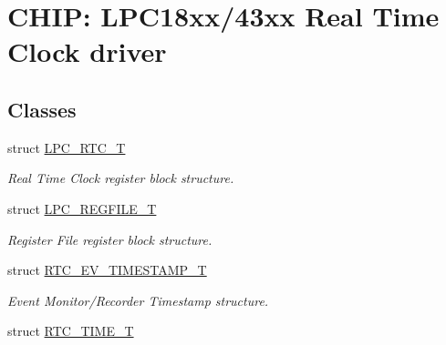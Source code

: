 \hypertarget{group___r_t_c__18_x_x__43_x_x}{}\section{C\+H\+IP\+: L\+P\+C18xx/43xx Real Time Clock driver}
\label{group___r_t_c__18_x_x__43_x_x}
\subsection*{Classes}
\begin{DoxyCompactItemize}
\item 
struct \hyperlink{struct_l_p_c___r_t_c___t}{L\+P\+C\+\_\+\+R\+T\+C\+\_\+T}
\begin{DoxyCompactList}\small\item\em Real Time Clock register block structure. \end{DoxyCompactList}\item 
struct \hyperlink{struct_l_p_c___r_e_g_f_i_l_e___t}{L\+P\+C\+\_\+\+R\+E\+G\+F\+I\+L\+E\+\_\+T}
\begin{DoxyCompactList}\small\item\em Register File register block structure. \end{DoxyCompactList}\item 
struct \hyperlink{struct_r_t_c___e_v___t_i_m_e_s_t_a_m_p___t}{R\+T\+C\+\_\+\+E\+V\+\_\+\+T\+I\+M\+E\+S\+T\+A\+M\+P\+\_\+T}
\begin{DoxyCompactList}\small\item\em Event Monitor/\+Recorder Timestamp structure. \end{DoxyCompactList}\item 
struct \hyperlink{struct_r_t_c___t_i_m_e___t}{R\+T\+C\+\_\+\+T\+I\+M\+E\+\_\+T}
\end{DoxyCompactItemize}
